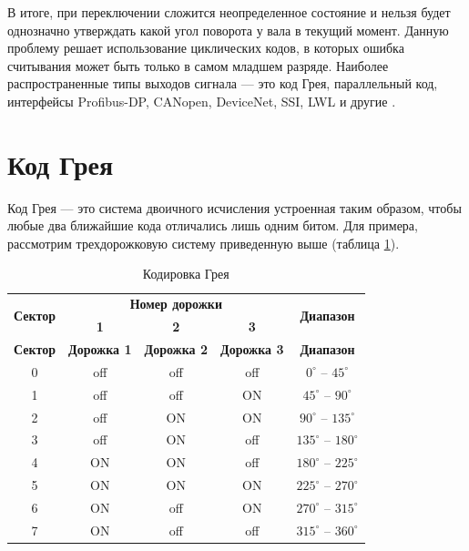 В итоге, при переключении сложится неопределенное состояние и нельзя будет однозначно утверждать какой угол поворота у вала в текущий момент. Данную проблему решает использование циклических кодов, в которых ошибка считывания может быть только в самом младшем разряде. Наиболее распространенные типы выходов сигнала --- это код Грея, параллельный код, интерфейсы Profibus-DP, CANopen, DeviceNet, SSI, LWL и другие \cite{epromauto:enc}.

\section{Код Грея}

Код Грея --- это система двоичного исчисления устроенная таким образом, чтобы любые два ближайшие кода отличались лишь одним битом. Для примера, рассмотрим трехдорожковую систему приведенную выше (таблица \ref{tab:gray}).

\begin{longtable}[c]{|c|c|c|c|c|}
    \caption{Кодировка Грея\label{tab:gray}}\\
    \hline
    \multirow{2}{*}{\textbf{Сектор}} & \multicolumn{3}{|c|}{\textbf{Номер дорожки}} & \multirow{2}{*}{\textbf{Диапазон}}\\
    \cline{2-4}
    & \textbf{1} & \textbf{2} & \textbf{3} &\\
    \hline
    \endfirsthead
    \hline
    \textbf{Сектор} & \textbf{Дорожка 1} & \textbf{Дорожка 2} & \textbf{Дорожка 3} & \textbf{Диапазон}\\
    \hline
    \endhead
    0 & off & off & off & $0^{\circ}$ -- $45^{\circ}$\\
    \hline
    1 & off & off & \cellcolor{green!20}ON & $45^{\circ}$ -- $90^{\circ}$\\
    \hline
    2 & off & \cellcolor{green!20}ON & \cellcolor{green!20}ON & $90^{\circ}$ -- $135^{\circ}$\\
    \hline
    3 & off & \cellcolor{green!20}ON & off & $135^{\circ}$ -- $180^{\circ}$\\
    \hline
    4 & \cellcolor{green!20}ON & \cellcolor{green!20}ON & off & $180^{\circ}$ -- $225^{\circ}$\\
    \hline
    5 & \cellcolor{green!20}ON & \cellcolor{green!20}ON & \cellcolor{green!20}ON & $225^{\circ}$ -- $270^{\circ}$\\
    \hline
    6 & \cellcolor{green!20}ON & off & \cellcolor{green!20}ON & $270^{\circ}$ -- $315^{\circ}$\\
    \hline
    7 & \cellcolor{green!20}ON & off & off & $315^{\circ}$ -- $360^{\circ}$\\
    \hline
\end{longtable}

